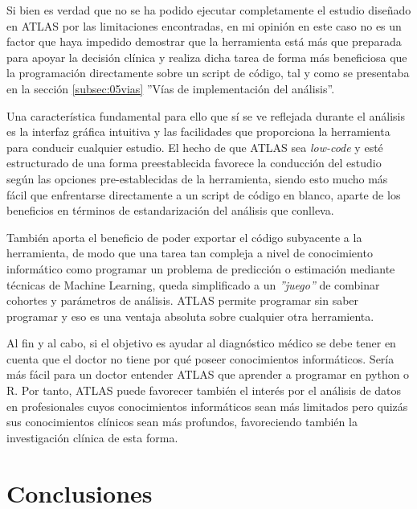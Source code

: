 Si bien es verdad que no se ha podido ejecutar completamente el estudio diseñado en ATLAS por las limitaciones encontradas, en mi opinión en este caso no es un factor que haya impedido demostrar que la herramienta está más que preparada para apoyar la decisión clínica y realiza dicha tarea de forma más beneficiosa que la programación directamente sobre un script de código, tal y como se presentaba en la sección \ref{subsec:05vias} ''Vías de implementación del análisis''. 

Una característica fundamental para ello que sí se ve reflejada durante el análisis es la interfaz gráfica intuitiva y las facilidades que proporciona la herramienta para conducir cualquier estudio. El hecho de que ATLAS sea \textit{low-code} y esté estructurado de una forma preestablecida favorece la conducción del estudio según las opciones pre-establecidas de la herramienta, siendo esto mucho más fácil que enfrentarse directamente a un script de código en blanco, aparte de los beneficios en términos de estandarización del análisis que conlleva.

También aporta el beneficio de poder exportar el código subyacente a la herramienta, de modo que una tarea tan compleja a nivel de conocimiento informático como programar un problema de predicción o estimación mediante técnicas de Machine Learning, queda simplificado a un \textit{''juego''} de combinar cohortes y parámetros de análisis. ATLAS permite programar sin saber programar y eso es una ventaja absoluta sobre cualquier otra herramienta.

Al fin y al cabo, si el objetivo es ayudar al diagnóstico médico se debe tener en cuenta que el doctor no tiene por qué poseer conocimientos informáticos. Sería más fácil para un doctor entender ATLAS que aprender a programar en python o R. Por tanto, ATLAS puede favorecer también el interés por el análisis de datos en profesionales cuyos conocimientos informáticos sean más limitados pero quizás sus conocimientos clínicos sean más profundos, favoreciendo también la investigación clínica de esta forma. 


\section{Conclusiones} \label{sec:09conclusiones}


